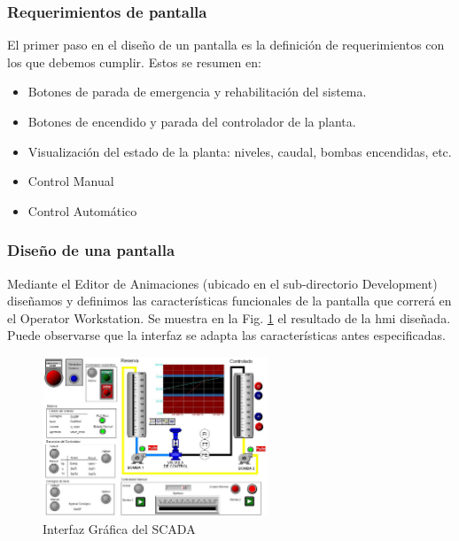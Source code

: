 \subsubsection{Requerimientos de pantalla}
El primer paso en el diseño de un pantalla es la definición de requerimientos 
con los que debemos cumplir. Estos se resumen en:
\begin{itemize}
 \item Botones de parada de emergencia y rehabilitación del sistema.
 \item Botones de encendido y parada del controlador de la planta.
 \item Visualización del estado de la planta: niveles, caudal, bombas
 encendidas, etc.
 \item Control Manual
 \item Control Automático
\end{itemize}

\subsubsection{Diseño de una pantalla}
Mediante el Editor de Animaciones (ubicado en el sub-directorio
Development) diseñamos y definimos las características funcionales de 
la pantalla que correrá en el Operator Workstation. Se muestra en la Fig. 
\ref{fig:hmiscada} el resultado de la \gls{hmi} diseñada.
Puede observarse que la interfaz se adapta las características antes
especificadas.
  \begin{figure}[!ht]
	\centering
	\includegraphics[width=0.6\textwidth]
	{Cap5-SCADA/images/hmiScada.jpeg}
	\caption{Interfaz Gráfica del SCADA}
	\label{fig:hmiscada}
  \end{figure}


